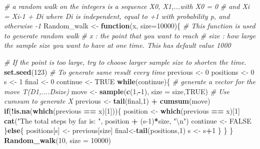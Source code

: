 \documentclass[]{article}
\newenvironment{Shaded}{\begin{snugshade}}{\end{snugshade}}
\newcommand{\CharTok}[1]{\textcolor[rgb]{0.31,0.60,0.02}{#1}}
\newcommand{\CommentTok}[1]{\textcolor[rgb]{0.56,0.35,0.01}{\textit{#1}}}
\newcommand{\ControlFlowTok}[1]{\textcolor[rgb]{0.13,0.29,0.53}{\textbf{#1}}}
\newcommand{\DataTypeTok}[1]{\textcolor[rgb]{0.13,0.29,0.53}{#1}}
\newcommand{\DecValTok}[1]{\textcolor[rgb]{0.00,0.00,0.81}{#1}}
\newcommand{\KeywordTok}[1]{\textcolor[rgb]{0.13,0.29,0.53}{\textbf{#1}}}
\newcommand{\NormalTok}[1]{#1}
\newcommand{\OperatorTok}[1]{\textcolor[rgb]{0.81,0.36,0.00}{\textbf{#1}}}
\newcommand{\OtherTok}[1]{\textcolor[rgb]{0.56,0.35,0.01}{#1}}
\newcommand{\StringTok}[1]{\textcolor[rgb]{0.31,0.60,0.02}{#1}}
\begin{document}
\begin{Shaded}
\begin{Highlighting}[]
\CommentTok{# a random walk on the integers is a sequence X0, X1,...with X0 = 0}
\CommentTok{# and Xi = Xi-1 + Di where Di is independent, equal to +1 with probability p, and otherwise -1}
\NormalTok{Random_walk <-}\StringTok{ }\ControlFlowTok{function}\NormalTok{(x, }\DataTypeTok{size=}\DecValTok{10000}\NormalTok{)\{}
  \CommentTok{# This function is used to generate random walk}
  \CommentTok{# x : the point that you want to reach}
  \CommentTok{# size : how large the sample size you want to have at one time. This has default value 1000}
  
  \CommentTok{# If the point is too large, try to choose larger sample size to shorten the time.}
  \KeywordTok{set.seed}\NormalTok{(}\DecValTok{123}\NormalTok{) }\CommentTok{# To generate same result every time}
\NormalTok{  previous <-}\StringTok{ }\DecValTok{0}
\NormalTok{  positions <-}\StringTok{ }\DecValTok{0}
\NormalTok{  s <-}\StringTok{ }\DecValTok{1} 
\NormalTok{  final <-}\StringTok{ }\DecValTok{0}
\NormalTok{  continue <-}\StringTok{ }\OtherTok{TRUE}
  \ControlFlowTok{while}\NormalTok{(continue)\{}
    \CommentTok{# generate a vector for the move T(D1,....Dsize)}
\NormalTok{    move <-}\StringTok{ }\KeywordTok{sample}\NormalTok{(}\KeywordTok{c}\NormalTok{(}\DecValTok{1}\NormalTok{,}\OperatorTok{-}\DecValTok{1}\NormalTok{), }\DataTypeTok{size =}\NormalTok{ size,}\OtherTok{TRUE}\NormalTok{)}
    \CommentTok{# Use cumsum to generate X}
\NormalTok{    previous <-}\StringTok{ }\KeywordTok{tail}\NormalTok{(final,}\DecValTok{1}\NormalTok{) }\OperatorTok{+}\StringTok{ }\KeywordTok{cumsum}\NormalTok{(move)}
      \ControlFlowTok{if}\NormalTok{(}\OperatorTok{!}\KeywordTok{is.na}\NormalTok{(}\KeywordTok{which}\NormalTok{(previous }\OperatorTok{==}\StringTok{ }\NormalTok{x)[}\DecValTok{1}\NormalTok{]))\{}
\NormalTok{        position <-}\StringTok{ }\KeywordTok{which}\NormalTok{(previous }\OperatorTok{==}\StringTok{ }\NormalTok{x)[}\DecValTok{1}\NormalTok{]}
        \KeywordTok{cat}\NormalTok{(}\StringTok{"The total steps by far is: "}\NormalTok{, position }\OperatorTok{+}\StringTok{ }\NormalTok{(s}\DecValTok{-1}\NormalTok{)}\OperatorTok{*}\NormalTok{size, }\StringTok{"}\CharTok{\textbackslash{}n}\StringTok{"}\NormalTok{)}
\NormalTok{        continue <-}\StringTok{ }\OtherTok{FALSE}
\NormalTok{      \}}\ControlFlowTok{else}\NormalTok{\{}
\NormalTok{        positions[s] <-}\StringTok{ }\NormalTok{previous[size]}
\NormalTok{        final<-}\KeywordTok{tail}\NormalTok{(positions,}\DecValTok{1}\NormalTok{)}
\NormalTok{        s <-}\StringTok{ }\NormalTok{s}\OperatorTok{+}\DecValTok{1}
\NormalTok{      \}}
\NormalTok{  \}}
\NormalTok{\}}
\KeywordTok{Random_walk}\NormalTok{(}\DecValTok{10}\NormalTok{, }\DataTypeTok{size =} \DecValTok{10000}\NormalTok{)}
\end{Highlighting}
\end{Shaded}
\end{document}
